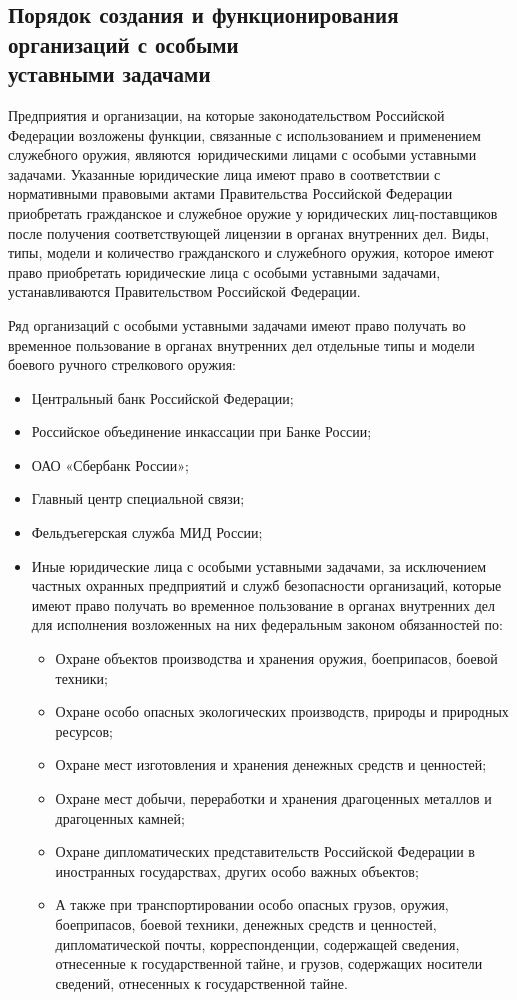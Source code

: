 \documentclass[a4paper,12pt,fleqn]{article} %
\begin{document}
\subsection{Порядок создания и функционирования организаций с особыми \\уставными задачами}

Предприятия и организации, на которые законодательством Российской Федерации возложены функции, связанные с использованием и применением служебного оружия, являются юридическими лицами с особыми уставными задачами. Указанные юридические лица  имеют право в соответствии с нормативными правовыми актами Правительства Российской Федерации приобретать гражданское и служебное оружие у юридических лиц-поставщиков после получения соответствующей лицензии в органах внутренних дел. Виды, типы, модели и количество гражданского и служебного оружия, которое имеют право приобретать юридические лица с особыми уставными задачами, устанавливаются Правительством Российской Федерации.

Ряд организаций с особыми уставными задачами имеют право получать во временное пользование в органах внутренних дел отдельные типы и модели боевого ручного стрелкового оружия:

\begin{itemize}
	\item Центральный банк Российской Федерации;
	\item Российское объединение инкассации при Банке России;
	\item ОАО «Сбербанк России»;
	\item Главный центр специальной связи; 
	\item Фельдъегерская служба МИД России; 
	\item Иные юридические лица с особыми уставными задачами, за исключением частных охранных предприятий и служб безопасности организаций, которые имеют право получать во временное пользование в органах внутренних дел для исполнения возложенных на них федеральным законом обязанностей по: 
	\begin{itemize}
		\item Охране объектов производства и хранения оружия, боеприпасов, боевой техники; 
		\item Охране особо опасных экологических производств, природы и природных ресурсов; 
		\item Охране мест изготовления и хранения денежных средств и ценностей; 
		\item Охране мест добычи, переработки и хранения драгоценных металлов и драгоценных камней; 
		\item Охране дипломатических представительств Российской Федерации в иностранных государствах, других особо важных объектов; 
		\item А также при транспортировании особо опасных грузов, оружия, боеприпасов, боевой техники, денежных средств и ценностей, дипломатической почты, корреспонденции, содержащей сведения, отнесенные к государственной тайне, и грузов, содержащих носители сведений, отнесенных к государственной тайне.
	\end{itemize}
\end{itemize}
\end{document}
